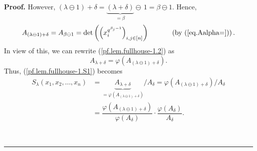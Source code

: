 \documentclass[numbers=enddot,12pt,final,onecolumn,notitlepage]{scrartcl}%
\numberwithin{exer}{section}
\theoremstyle{definition}
\newenvironment{proof}[1][Proof]{\noindent\textbf{#1.} }{\ \rule{0.5em}{0.5em}}
\theoremstyle{plainsl}
\begin{document}
\begin{proof}
However, $\left(  \lambda\ominus1\right)  +\delta=\underbrace{\left(
\lambda+\delta\right)  }_{=\beta}\ominus\,1=\beta\ominus1$. Hence,
\[
A_{\left(  \lambda\ominus1\right)  +\delta}=A_{\beta\ominus1}=\det\left(
\left(  x_{i}^{q^{\beta_{j}-1}}\right)  _{i,j\in\left[  n\right]  }\right)
\ \ \ \ \ \ \ \ \ \ \left(  \text{by (\ref{eq.Aalpha=})}\right)  .
\]
In view of this, we can rewrite (\ref{pf.lem.fullhouse-1.2}) as%
\[
A_{\lambda+\delta}=\varphi\left(  A_{\left(  \lambda\ominus1\right)  +\delta
}\right)  .
\]
Thus, (\ref{pf.lem.fullhouse-1.S1}) becomes%
\begin{align}
S_{\lambda}\left(  x_{1},x_{2},\ldots,x_{n}\right)   &
=\underbrace{A_{\lambda+\delta}}_{=\varphi\left(  A_{\left(  \lambda
\ominus1\right)  +\delta}\right)  }/A_{\delta}=\varphi\left(  A_{\left(
\lambda\ominus1\right)  +\delta}\right)  /A_{\delta}\nonumber\\
&  =\dfrac{\varphi\left(  A_{\left(  \lambda\ominus1\right)  +\delta}\right)
}{\varphi\left(  A_{\delta}\right)  }\cdot\dfrac{\varphi\left(  A_{\delta
}\right)  }{A_{\delta}}. \label{pf.lem.fullhouse-1.4}%
\end{align}



\end{proof}
\end{document}
